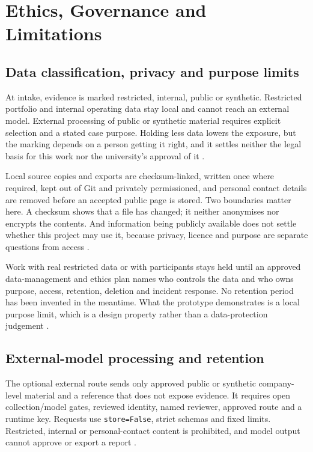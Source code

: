 \chapter{Ethics, Governance and Limitations}
\section{Data classification, privacy and purpose limits}

At intake, evidence is marked restricted, internal, public or synthetic. Restricted portfolio and
internal operating data stay local and cannot reach an external model. External processing of public
or synthetic material requires explicit selection and a stated case purpose. Holding less data lowers
the exposure, but the marking depends on a person getting it right, and it settles neither the legal
basis for this work nor the university's approval of it \citep{cddo2023genai,nist2023airmf}.

Local source copies and exports are checksum-linked, written once where required, kept out of Git and
privately permissioned, and personal contact details are removed before an accepted public page is
stored. Two boundaries matter here. A checksum shows that a file has changed; it neither anonymises
nor encrypts the contents. And information being publicly available does not settle whether this
project may use it, because privacy, licence and purpose are separate questions from access
\citep{gebru2021datasheets,cddo2023genai}.

Work with real restricted data or with participants stays held until an approved data-management and
ethics plan names who controls the data and who owns purpose, access, retention, deletion and incident
response. No retention period has been invented in the meantime. What the prototype demonstrates is a
local purpose limit, which is a design property rather than a data-protection judgement
\citep{nist2023airmf,cddo2023genai}.
\section{External-model processing and retention}

The optional external route sends only approved public or synthetic company-level material and a
reference that does not expose evidence. It requires open collection/model gates, reviewed identity,
named reviewer, approved route and a runtime key. Requests use \texttt{store=False}, strict schemas and
fixed limits. Restricted, internal or personal-contact content is prohibited, and model output cannot
approve or export a report \citep{cddo2023genai,nist2023airmf}.


